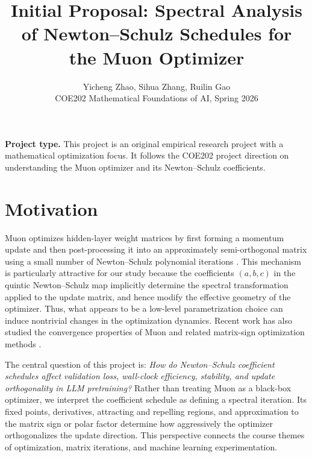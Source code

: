 \documentclass[10pt]{article}
\title{\vspace{-1.2em}\textbf{Initial Proposal: Spectral Analysis of Newton--Schulz Schedules for the Muon Optimizer}}
\author{Yicheng Zhao, Sihua Zhang, Ruilin Gao\\COE202 Mathematical Foundations of AI, Spring 2026}
\date{}
\begin{document}
\maketitle
\vspace{-1.2em}

\textbf{Project type.}
This project is an original empirical research project with a mathematical optimization focus. It follows the COE202 project direction on understanding the Muon optimizer and its Newton--Schulz coefficients.

\section*{Motivation}

Muon optimizes hidden-layer weight matrices by first forming a momentum update and then post-processing it into an approximately semi-orthogonal matrix using a small number of Newton--Schulz polynomial iterations \cite{jordan2024muon}. This mechanism is particularly attractive for our study because the coefficients $(a,b,c)$ in the quintic Newton--Schulz map implicitly determine the spectral transformation applied to the update matrix, and hence modify the effective geometry of the optimizer. Thus, what appears to be a low-level parametrization choice can induce nontrivial changes in the optimization dynamics. Recent work has also studied the convergence properties of Muon and related matrix-sign optimization methods \citep{kim2026convergence,amsel2025polar,moddednanogpt2024}.

The central question of this project is: \textit{How do Newton--Schulz coefficient schedules affect validation loss, wall-clock efficiency, stability, and update orthogonality in LLM pretraining?}
Rather than treating Muon as a black-box optimizer, we interpret the coefficient schedule as defining a spectral iteration. Its fixed points, derivatives, attracting and repelling regions, and approximation to the matrix sign or polar factor determine how aggressively the optimizer orthogonalizes the update direction. This perspective connects the course themes of optimization, matrix iterations, and machine learning experimentation.


\end{document}
